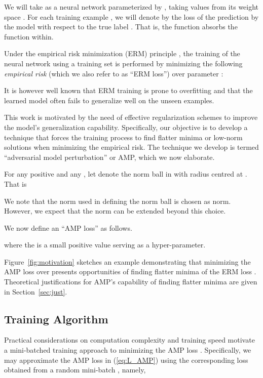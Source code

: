 \documentclass[final]{cvpr}
\begin{document}
We will take  as a neural network parameterized by , taking values from its weight space . For each training example , we will denote by  the loss of the prediction  by the model with respect to the true label . That is, the function  absorbs the function  within.

Under the empirical risk minimization (ERM) principle \cite{vapnik1998statistical}, the training of the neural network using a training set  is performed by minimizing the following {\em empirical risk} (which we also refer to as ``ERM loss'')  over parameter :


It is however well known that ERM training is prone to overfitting \cite{vapnik1998statistical} and that the learned model often fails to generalize well on the unseen examples. 

This work is motivated by the need of effective regularization schemes to improve the model's generalization capability. Specifically, our objective is to develop a technique that forces the training process to find flatter minima or low-norm solutions when minimizing the empirical risk. The technique we develop is termed ``adversarial model perturbation'' or AMP, which we now elaborate. 

For any positive  and any , let  denote the norm ball in  with radius  centred at . That is


We note that the norm used in defining the norm ball
is chosen as  norm. However, we expect that the norm can be extended beyond this choice.

We now define an ``AMP loss''  as follows.

where the  is a small positive value serving as a hyper-parameter. 

Figure~\ref{fig:motivation} sketches an example demonstrating that minimizing the AMP loss  over  presents opportunities of finding flatter minima of the ERM loss . Theoretical justifications for AMP's capability of finding flatter minima are given in Section~\ref{sec:just}.

\subsection{Training Algorithm}

Practical considerations on computation complexity and training speed motivate a mini-batched training approach to minimizing the AMP loss . Specifically, we may approximate the AMP loss in (\ref{eq:L_AMP}) using the corresponding loss obtained from a random mini-batch , namely,
\end{document}
